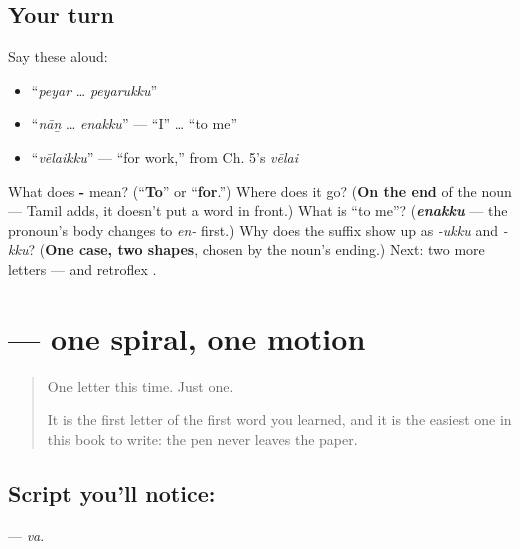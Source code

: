 \subsection*{Your turn}
Say these aloud:

\begin{itemize}
\raggedright
  \item \textquotedblleft{}\emph{peyar} … \emph{peyarukku}\textquotedblright{}
  \item \textquotedblleft{}\emph{nāṉ} … \emph{enakku}\textquotedblright{} — \textquotedblleft{}I\textquotedblright{} … \textquotedblleft{}to me\textquotedblright{}
  \item \textquotedblleft{}\emph{vēlaikku}\textquotedblright{} — \textquotedblleft{}for work,\textquotedblright{} from Ch. 5's \emph{vēlai}
\end{itemize}

\begin{tcolorbox}[breakable,colback=teal!4,colframe=teal!35!black,title={Before you move on}]
What does \textbf{-} mean? (\textquotedblleft{}\textbf{To}\textquotedblright{} or \textquotedblleft{}\textbf{for}.\textquotedblright{}) Where does it go? (\textbf{On the end} of the noun — Tamil adds, it doesn't put a word in front.) What is \textquotedblleft{}to me\textquotedblright{}? (\emph{\textbf{enakku}} — the pronoun's body changes to \emph{en-} first.) Why does the suffix show up as \emph{-ukku} and \emph{-kku}? (\textbf{One case, two shapes}, chosen by the noun's ending.) Next: two more letters —  and retroflex .
\end{tcolorbox}
\section[\texorpdfstring{\ta{வ} (va)}{வ (va)}]{ — one spiral, one motion}

\label{lesson:TA-S01-va}



\begin{quote}
One letter this time. Just one.

It is the first letter of the first word you learned, and it is the easiest one in this book to write: the pen never leaves the paper.
\end{quote}

\subsection*{Script you'll notice: }
\textbf{} — \emph{va}.

